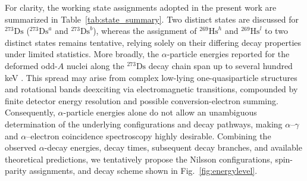 \documentclass[final,5p,times,twocolumn,number,sort&compress]{elsarticle}
\begin{document}
For clarity, the working state assignments adopted in the present work are summarized in Table~\ref{tab:state_summary}. Two distinct states are discussed for $^{273}\mathrm{Ds}$ ($^{273}\mathrm{Ds}^{a}$ and $^{273}\mathrm{Ds}^{b}$), whereas the assignment of $^{269}\mathrm{Hs}^{h}$ and $^{269}\mathrm{Hs}^{l}$ to two distinct states remains tentative, relying solely on their differing decay properties under limited statistics. More broadly, the $\alpha$-particle energies reported for the deformed odd-$A$ nuclei along the $^{273}\mathrm{Ds}$ decay chain span up to several hundred keV \cite{dullmannCm248Ne2008,habaProduction265Sg2012}. This spread may arise from complex low-lying one-quasiparticle structures and rotational bands deexciting via electromagnetic transitions, compounded by finite detector energy resolution and possible conversion-electron summing. Consequently, $\alpha$-particle energies alone do not allow an unambiguous determination of the underlying configurations and decay pathways, making $\alpha$--$\gamma$ and $\alpha$--electron coincidence spectroscopy highly desirable. Combining the observed $\alpha$-decay energies, decay times, subsequent decay branches, and available theoretical predictions, we tentatively propose the Nilsson configurations, spin-parity assignments, and decay scheme shown in Fig.~\ref{fig:energylevel}.
\end{document}
